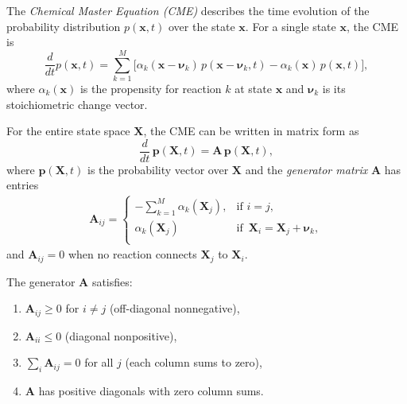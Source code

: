 \documentclass[review,onefignum,onetabnum]{siamart171218}
\begin{document}
\begin{definition}
The \textit{Chemical Master Equation (CME)} describes the time evolution of the probability distribution $p(\boldsymbol{x}, t)$ over the state $\boldsymbol{x}$. For a single state $\boldsymbol{x}$, the CME is
\begin{equation}
    \frac{d}{dt} p(\boldsymbol{x}, t) =
    \sum_{k=1}^{M} \big[\alpha_k(\boldsymbol{x} - \boldsymbol{\nu}_k)\, p(\boldsymbol{x} - \boldsymbol{\nu}_k, t)
    - \alpha_k(\boldsymbol{x})\, p(\boldsymbol{x}, t)\big],
\end{equation}
where $\alpha_k(\boldsymbol{x})$ is the propensity for reaction $k$ at state $\boldsymbol{x}$ and $\boldsymbol{\nu}_k$ is its stoichiometric change vector.

For the entire state space $\mathbf{X}$, the CME can be written in matrix form as
\begin{equation}
    \frac{d}{dt}\, \boldsymbol{p}(\mathbf{X}, t) = \mathbf{A}\, \boldsymbol{p}(\mathbf{X}, t),
\end{equation}
where $\boldsymbol{p}(\mathbf{X}, t)$ is the probability vector over $\mathbf{X}$ and the \textit{generator matrix} $\mathbf{A}$ has entries
\begin{align}
    \mathbf{A}_{ij} =
    \begin{cases}
        -\displaystyle\sum_{k=1}^{M} \alpha_k(\mathbf{X}_j), & \text{if } i=j, \\
         \alpha_k(\mathbf{X}_j) & \text{if }\, \mathbf{X}_i=\mathbf{X}_j+\boldsymbol{\nu}_k, \\
    \end{cases}
\end{align}
and $\mathbf{A}_{ij}=0$ when no reaction connects $\mathbf{X}_j$ to $\mathbf{X}_i$.
\end{definition}

\begin{remark}
The generator $\mathbf{A}$ satisfies:  
\begin{enumerate}
    \item $\mathbf{A}_{ij}\ge 0$ for $i\neq j$ (off-diagonal nonnegative),
    \item $\mathbf{A}_{ii}\le 0$ (diagonal nonpositive),
    \item $\sum_{i} \mathbf{A}_{ij}=0$ for all $j$ (each column sums to zero),
    \item $\mathbf{A}$ has positive diagonals with zero column sums.
\end{enumerate}
\end{remark}
\end{document}

